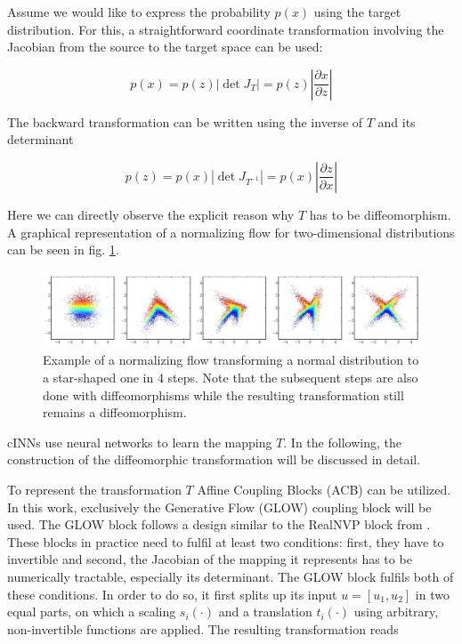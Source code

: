 Assume we would like to express the probability $p(x)$ using the target distribution. For this, a straightforward coordinate transformation involving the Jacobian from the source to the target space can be used:

\begin{equation*}
	p(x) = p(z) \left| \det J_T \right| = p(z) \left| \frac{\partial x}{\partial z} \right|
\end{equation*}

The backward transformation can be written using the inverse of $T$ and its determinant

\begin{equation*}
	p(z) = p(x) \left| \det J_{T^{-1}} \right| = p(x) \left| \frac{\partial z}{\partial x} \right|
\end{equation*}

Here we can directly observe the explicit reason why $T$ has to be diffeomorphism. A graphical representation of a normalizing flow for two-dimensional distributions can be seen in fig. \ref{fig:NF_example}.

\begin{figure}[h!]
	\centering
	\includegraphics[width=\textwidth]{figures/neural_networks/flow}
	\caption{Example of a normalizing flow transforming a normal distribution to a star-shaped one in 4 steps. Note that the subsequent steps are also done with diffeomorphisms while the resulting transformation still remains a diffeomorphism. \cite{Papamakarios_NF}}
	\label{fig:NF_example}
\end{figure}

cINNs use neural networks to learn the mapping $T$. In the following, the construction of the diffeomorphic transformation will be discussed in detail.


To represent the transformation $T$ Affine Coupling Blocks (ACB) can be utilized. In this work, exclusively the Generative Flow (GLOW) coupling block \cite{glow_paper} will be used. The GLOW block follows a design similar to the RealNVP block from \cite{RealNVP}. These blocks in practice need to fulfil at least two conditions: first, they have to invertible and second, the Jacobian of the mapping it represents has to be numerically tractable, especially its determinant. The GLOW block fulfils both of these conditions. In order to do so, it first splits up its input $u = [u_1, u_2]$ in two equal parts, on which a scaling $s_i(\cdot)$ and a translation $t_i(\cdot)$ using arbitrary, non-invertible functions are applied. The resulting transformation reads

